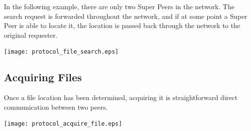 In the following example, there are only two Super Peers in the network.  The
search request is forwarded throughout the network, and if at some point a Super
Peer is able to locate it, the location is passed back through the network to
the original requester.

\texttt{[image: protocol\_file\_search.eps]}

\subsection{Acquiring Files}

Once a file location has been determined, acquiring it is straightforward direct
communication between two peers.

\texttt{[image: protocol\_acquire\_file.eps]}
